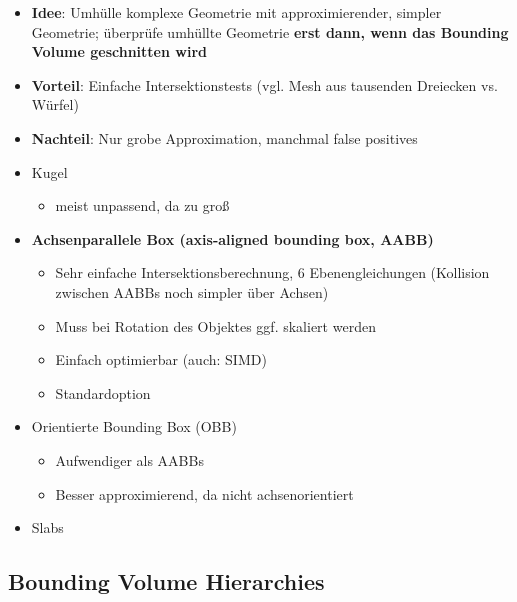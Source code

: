 \documentclass[10pt,a4paper]{article}
\begin{document}
	\begin{itemize}
		\item \textbf{Idee}: Umhülle komplexe Geometrie mit approximierender, simpler Geometrie; überprüfe umhüllte Geometrie \textbf{erst dann, wenn das Bounding Volume geschnitten wird}
		\item \textbf{Vorteil}: Einfache Intersektionstests (vgl. Mesh aus tausenden Dreiecken vs. Würfel)
		\item \textbf{Nachteil}: Nur grobe Approximation, manchmal false positives
		\item Kugel
		\begin{itemize}
			\item meist unpassend, da zu groß
		\end{itemize}
		\item \textbf{Achsenparallele Box (axis-aligned bounding box, AABB)}
		\begin{itemize}
			\item Sehr einfache Intersektionsberechnung, 6 Ebenengleichungen (Kollision zwischen AABBs noch simpler über Achsen)
			\item Muss bei Rotation des Objektes ggf. skaliert werden
			\item Einfach optimierbar (auch: SIMD)
			\item Standardoption
		\end{itemize}
		\item Orientierte Bounding Box (OBB)
		\begin{itemize}
			\item Aufwendiger als AABBs
			\item Besser approximierend, da nicht achsenorientiert
		\end{itemize}
		\item Slabs
	\end{itemize}
	
	\newpage
	\subsection{Bounding Volume Hierarchies}
	\label{ds:sub:bounding_volume_hierarchies}
\end{document}
